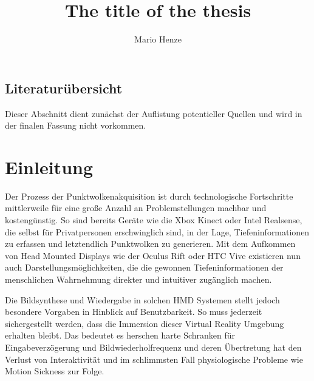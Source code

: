 \documentclass[hyperref, beleg, german]{cgvpub}
\author{Mario Henze}
\title{The title of the thesis}
\begin{document}
\section{Literaturübersicht}

Dieser Abschnitt dient zunächst der Auflistung potentieller Quellen und wird in
der finalen Fassung nicht vorkommen.

\begin{description}
	\item[\cite{discher2018point}]
	\item[\cite{rusinkiewicz2000qsplat}]
	\item[\cite{goswami2010high}]
	\item[\cite{wimmer2006instant}]
	\item[\cite{shum2000review}]
	\item[\cite{mark1997post}]
	\item[\cite{mcmillan1995head}]
	\item[\cite{chang1999ldi}]
	\item[\cite{he1998layered}]
	\item[\cite{mcmillan2009image}]
\end{description}

\chapter{Einleitung}%
\label{sec:einleitung}

Der Prozess der Punktwolkenakquisition ist durch technologische Fortschritte
mittlerweile für eine große Anzahl an Problemstellungen machbar und
kostengünstig. So sind bereits Geräte wie die Xbox Kinect oder Intel
Realsense, die selbst für Privatpersonen erschwinglich sind, in der Lage,
Tiefeninformationen zu erfassen und letztendlich Punktwolken zu generieren. Mit
dem Aufkommen von Head Mounted Displays wie der Oculus Rift oder HTC Vive
existieren nun auch Darstellungsmöglichkeiten, die die gewonnen
Tiefeninformationen der menschlichen Wahrnehmung direkter und intuitiver
zugänglich machen.

Die Bildsynthese und Wiedergabe in solchen HMD Systemen stellt jedoch besondere
Vorgaben in Hinblick auf Benutzbarkeit. So muss jederzeit sichergestellt werden,
dass die Immersion dieser Virtual Reality Umgebung erhalten bleibt. Das bedeutet
es herschen harte Schranken für Eingabeverzögerung und Bildwiederholfrequenz und
deren Übertretung hat den Verlust von Interaktivität und im schlimmsten Fall
physiologische Probleme wie Motion Sickness zur Folge.
\end{document}
